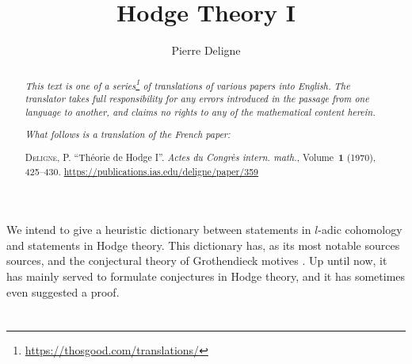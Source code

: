 \documentclass{article}
\title{Hodge Theory I}
\author{Pierre Deligne}
\date{}
\theoremstyle{plain}
\theoremstyle{definition}
\newcommand{\oldpage}[1]{\marginpar{\footnotesize$\Big\vert$ \textit{p.~#1}}}
\begin{document}
\maketitle
\thispagestyle{fancy}

\renewcommand{\abstractname}{Translator's note.}

\begin{abstract}
  \renewcommand*{\thefootnote}{\fnsymbol{footnote}}
  \emph{This text is one of a series\footnote{\url{https://thosgood.com/translations/}} of translations of various papers into English.}
  \emph{The translator takes full responsibility for any errors introduced in the passage from one language to another, and claims no rights to any of the mathematical content herein.}
  
  \emph{What follows is a translation of the French paper:}

  \medskip\noindent
  \textsc{Deligne, P.}
  ``Th\'{e}orie de Hodge I''.
  \emph{Actes du Congr\`{e}s intern. math.}, Volume~\textbf{1} (1970), 425--430.
  \url{https://publications.ias.edu/deligne/paper/359}
\end{abstract}

\setcounter{footnote}{0}

\bigskip



\oldpage{425}
We intend to give a heuristic dictionary between statements in $l$-adic cohomology and statements in Hodge theory.
This dictionary has, as its most notable sources sources, \cite{3} and the conjectural theory of Grothendieck motives \cite{2}.
Up until now, it has mainly served to formulate conjectures in Hodge theory, and it has sometimes even suggested a proof.


\section{}
\label{1}
\end{document}

